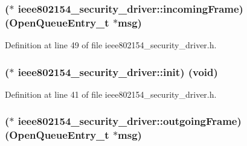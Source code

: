 \subsubsection[{\texorpdfstring{incoming\+Frame}{incomingFrame}}]{($\ast$  ieee802154\+\_\+security\+\_\+driver\+::incoming\+Frame) ({\bf Open\+Queue\+Entry\+\_\+t} $\ast$msg)}\hypertarget{structieee802154__security__driver_ae822d5f1fa8ba504ae9b2f9909cfc7a4}{}\label{structieee802154__security__driver_ae822d5f1fa8ba504ae9b2f9909cfc7a4}


Definition at line 49 of file ieee802154\+\_\+security\+\_\+driver.\+h.

\subsubsection[{\texorpdfstring{init}{init}}]{($\ast$  ieee802154\+\_\+security\+\_\+driver\+::init) ({\bf void})}\hypertarget{structieee802154__security__driver_a7189635a857821803ce053824da4005a}{}\label{structieee802154__security__driver_a7189635a857821803ce053824da4005a}


Definition at line 41 of file ieee802154\+\_\+security\+\_\+driver.\+h.

\subsubsection[{\texorpdfstring{outgoing\+Frame}{outgoingFrame}}]{($\ast$  ieee802154\+\_\+security\+\_\+driver\+::outgoing\+Frame) ({\bf Open\+Queue\+Entry\+\_\+t} $\ast$msg)}\hypertarget{structieee802154__security__driver_a469618342f4488905c0968e79947d9af}{}\label{structieee802154__security__driver_a469618342f4488905c0968e79947d9af}


